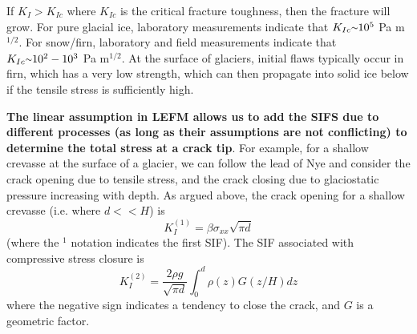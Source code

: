 \documentclass[12pt]{article}
\theoremstyle{definition}
\newcommand{\mytilde}{\raise.17ex\hbox{$\scriptstyle\mathtt{\sim}$}}
\begin{document}
If $K_I>K_{Ic}$ where $K_{Ic}$ is the critical fracture toughness, then the fracture will grow. For pure glacial ice, laboratory measurements indicate that $K_{Ic} \mytilde 10^5$ Pa m$^{1/2}$. For snow/firn, laboratory and field measurements indicate that $K_{Ic} \mytilde 10^2-10^3$ Pa m$^{1/2}$. At the surface of glaciers, initial flaws typically occur in firn, which has a very low strength, which can then propagate into solid ice below if the tensile stress is sufficiently high.

\textbf{The linear assumption in LEFM allows us to add the SIFS due to different processes (as long as their assumptions are not conflicting) to determine the total stress at a crack tip}. For example, for a shallow crevasse at the surface of a glacier, we can follow the lead of Nye and consider the crack opening due to tensile stress, and the crack closing due to glaciostatic pressure increasing with depth. As argued above, the crack opening for a shallow crevasse (i.e. where $d<<H$) is
\begin{equation}
K_I^{(1)} = \beta \sigma_{xx} \sqrt{\pi d}
\end{equation}
(where the $^{1}$ notation indicates the first SIF). The SIF associated with compressive stress closure is
\begin{equation}
K_I^{(2)} = \frac{2 \rho g}{\sqrt{\pi d}} \int_0^d \rho (z)  G (z/H) dz
\end{equation}
where the negative sign indicates a tendency to close the crack, and $G$ is a geometric factor.
\end{document}
